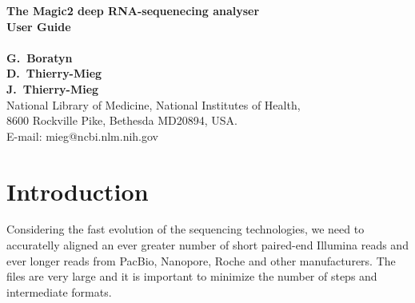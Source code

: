 \documentclass[11pt]{article}
\begin{document}
\noindent
{\Large \bf
The Magic2 deep RNA-sequenecing analyser\\User Guide
}\\
\\
{\bf G.~Boratyn}\\[2mm]
{\bf D.~Thierry-Mieg}\\[2mm]
{\bf J.~Thierry-Mieg}\\[2mm]
National Library of Medicine, National Institutes of Health,\\
8600 Rockville Pike, Bethesda MD20894, USA.\\
 E-mail: mieg@ncbi.nlm.nih.gov \\[2mm]






\begin{abstract}
  Magic2 is an accurate and sensitive long and short reads RNA deep-sequencing analyser.
  It can read local fasta/fastq files or import data-sets on the fly from the NCBI short-read-archive (SRA).
  It can export in a signle pass the alignment files, the coverage plots, the gene expression and many metrics.
  It is very easy to use because it analyzes in a dry run the top of the sequence files and the hardware
  to select the optimal strategy. This guide explains how to use this program.

  
  Magic2 is freely avaliable from
  git@github.com:NLM-DIR/Magic2
\end{abstract}


\newpage
\tableofcontents
\newpage

\section{Introduction}
Considering the fast evolution of the sequencing technologies, we need to
accuratelly aligned an ever greater number of short paired-end Illumina reads
and ever longer reads from PacBio, Nanopore, Roche and other manufacturers.
The files are very large and it is important to minimize the number of steps
and intermediate formats.
\end{document}
